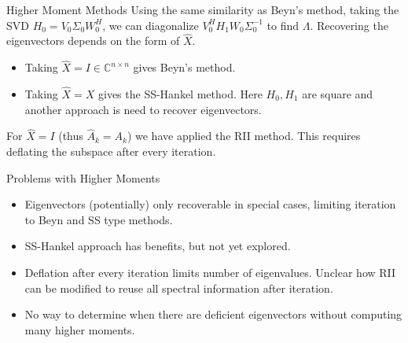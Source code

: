 \documentclass[mathserif]{beamer}
\begin{document}
\begin{frame}{Higher Moment Methods}
	Using the same similarity as Beyn's method, taking the SVD \( H_0 = V_0 \Sigma_0 W^H_0 \), we can diagonalize \( V_0^H H_1 W_0 \Sigma_0^{-1} \) to find \( \Lambda \).
	Recovering the eigenvectors depends on the form of \( \widehat{X} \).
	\vspace{1em}
	\begin{itemize}
		\item Taking \( \widehat{X} = I \in \mathbb{C}^{n \times n} \) gives Beyn's method.
			\vspace{1em}
		\item Taking \( \widehat{X} = X \) gives the SS-Hankel method.
			Here \( H_0, H_1 \) are square and another approach is need to recover eigenvectors.

	\end{itemize}

	\vspace{1em}
	For \( \widehat{X}=I \) (thus \( \widehat{A}_k = A_k \)) we have applied the RII method.
	This requires deflating the subspace after every iteration.

\end{frame}

\begin{frame}{Problems with Higher Moments}

	\begin{itemize}
		\item Eigenvectors (potentially) only recoverable in special cases, limiting iteration to Beyn and SS type methods.
			\vspace{1em}
		\item SS-Hankel approach has benefits, but not yet explored.
			\vspace{1em}
		\item Deflation after every iteration limits number of eigenvalues. Unclear how RII can be modified to reuse all spectral information after iteration.
			\vspace{1em}
		\item No way to determine when there are deficient eigenvectors without computing many higher moments.
			\vspace{1em}
		
	\end{itemize}

	
\end{frame}



\end{document}
